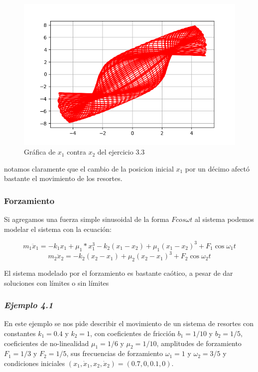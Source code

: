 \documentclass{article}
\begin{document}
\begin{figure}[ht!]
\centering
\includegraphics[width=\linewidth]{ejercicio33-versus.png}
\caption{Gráfica de $x_1$ contra $x_2$ del ejercicio 3.3}
\end{figure}

notamos claramente que el cambio de la posicion inicial $x_1$ por un décimo afectó bastante el movimiento de los resortes.

\subsubsection{Forzamiento}

Si agregamos una fuerza simple sinusoidal de la forma $Fcos\omega t$ al sistema podemos modelar el sistema con la ecuación:

\[ m_1\ddot{x}_1=-k_1x_1+\mu_1*x_1^3-k_2(x_1-x_2)+\mu_1(x_1-x_2)^3+F_1\cos\omega_1t \]
\[ m_2\ddot{x}_2=-k_2(x_2-x_1)+\mu_2(x_2-x_1)^3+F_2\cos\omega_2t \]

El sistema modelado por el forzamiento es bastante caótico, a pesar de dar soluciones con límites o sin límites

\newpage

\subsubsection*{\textit{Ejemplo 4.1}}
En este ejemplo se nos pide describir el movimiento de un sistema de resortes con constantes $k_1=0.4$ y $k_2=1$, con coeficientes de fricción $b_1=1/10$ y $b_2=1/5$, coeficientes de no-linealidad $\mu_1=1/6$ y $\mu_2=1/10$, amplitudes de forzamiento $F_1=1/3$ y $F_2=1/5$, sus frecuencias de forzamiento $\omega_1=1$ y $\omega_2=3/5$ y condiciones iniciales $(x_1,\dot{x}_1,x_2,\dot{x}_2)=(0.7,0,0.1,0)$.
\end{document}
